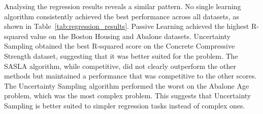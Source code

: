 \documentclass[conference]{IEEEtran}
\begin{document}
	\begin{table}[htbp]
		\centering
		\caption{Classification results for each learning strategy}
		\label{tab:classification_results}
	\end{table}
	
	Analysing the regression results reveals a similar pattern. No single learning algorithm consistently achieved the best performance across all datasets, as shown in Table~\ref{tab:regression_results}. Passive Learning achieved the highest R-squared value on the Boston Housing and Abalone datasets. Uncertainty Sampling obtained the best R-squared score on the Concrete Compressive Strength dataset, suggesting that it was better suited for the problem. The SASLA algorithm, while competitive, did not clearly outperform the other methods but maintained a performance that was competitive to the other scores. The Uncertainty Sampling algorithm performed the worst on the Abalone Age problem, which was the most complex problem. This suggests that Uncertainty Sampling is better suited to simpler regression tasks instead of complex ones.
	
\end{document}
